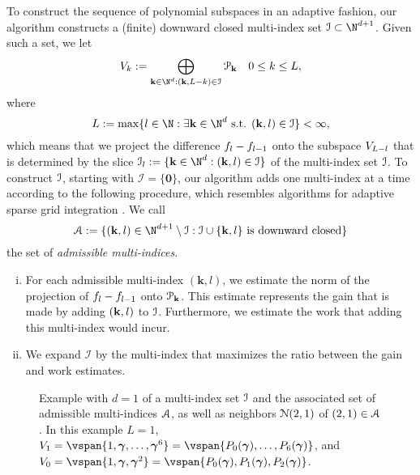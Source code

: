   To construct the sequence of polynomial subspaces in an adaptive fashion, our algorithm constructs a (finite) downward closed multi-index set $\mis\subset\N^{d+1}$. Given such a set, we let 
  \begin{equation*}
\vsp_{k}:=\bigoplus_{\mi\in\N^{d}: (\mi,L-k)\in\mis}\pss_{\mi}\quad 0\leq k\leq L,
\end{equation*}
where
\begin{equation*}
L:=\max\{l\in\N:\exists\mi\in\N^{d} \text{ s.t. }(\mi,l)\in\mis\}<\infty,
\end{equation*} 
which means that we project the difference $f_l-f_{l-1}$ onto the subspace $V_{L-l}$ that is determined by the slice $\mis_{l}:=\{\mi\in\N^d:(\mi,l)\in \mis\}$ of the multi-index set $\mathcal{I}$.
To construct $\mathcal{I}$, starting with $\mathcal{I}=\{\mathbf{0}\}$, our algorithm adds one multi-index at a time according to the following procedure, which resembles algorithms for adaptive sparse grid integration \cite{MR2163199,gerstner2003dimension}.
We call
\begin{equation*}
\mia:=\{(\mi,l)\in \N^{d+1}\setminus \mis:\mis\cup\{\mi,l\}\text{ is downward closed}\}
\end{equation*}
the set of \emph{admissible multi-indices}.
\begin{enumerate}[(i)]
	\item
For each admissible multi-index $(\mathbf{k},l)$, we estimate the norm of the projection of $f_l-f_{l-1}$ onto $\mathcal{P}_{\mathbf{k}}$. This estimate represents the gain that is made by adding $(\mathbf{k},l)$ to $\mathcal{I}$.
 Furthermore, we estimate the work that adding this multi-index would incur.
\item We expand $\mathcal{I}$ by the multi-index that maximizes the ratio between the gain and work estimates.
\end{enumerate}
\begin{figure}[ht]
	\centering
	
	\caption{Example with $d=1$ of a multi-index set $\mathcal{I}$ and the associated set of admissible multi-indices $\mathcal{A}$, as well as neighbors $\mathcal{N}(2,1)$ of  $(2,1)\in\mathcal{A}$. In this example $L=1$,  $\vsp_{1}=\vspan\{1,\psmi,\dots,\psmi^{6}\}=\vspan\{\leg_0(\psmi),\dots,\leg_{6}(\psmi)\}$, and  $\vsp_{0}=\vspan\{1,\psmi,\psmi^2\}=\vspan\{\leg_0(\psmi),\leg_1(\psmi),\leg_2(\psmi)\}$.}
	\label{fig:dc}
\end{figure}

